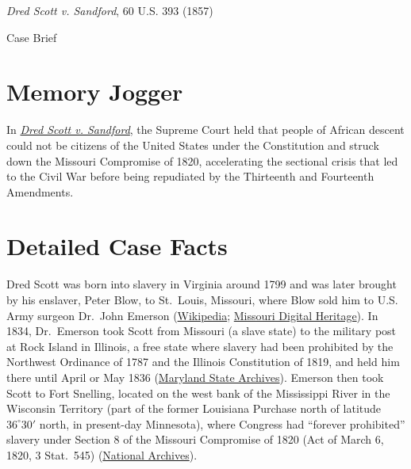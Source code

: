 \documentclass[12pt]{article}
\begin{document}
\begin{center}
{\LARGE \textit{Dred Scott v. Sandford}, 60 U.S. 393 (1857)\par}
\vspace{0.8em}
{\large Case Brief\par}
\end{center}
\vspace{1em}

\section{Memory Jogger}

In \href{https://www.courtlistener.com/opinion/87116/dred-scott-v-sandford/}{\textit{Dred Scott v. Sandford}}, the Supreme Court held that people of African descent could not be citizens of the United States under the Constitution and struck down the Missouri Compromise of 1820, accelerating the sectional crisis that led to the Civil War before being repudiated by the Thirteenth and Fourteenth Amendments.

\section{Detailed Case Facts}

Dred Scott was born into slavery in Virginia around 1799 and was later brought by his enslaver, Peter Blow, to St.\ Louis, Missouri, where Blow sold him to U.S. Army surgeon Dr.\ John Emerson (\href{https://en.wikipedia.org/wiki/Dred_Scott_v._Sandford}{Wikipedia}; \href{https://www.sos.mo.gov/archives/resources/africanamerican/scott/scott.asp}{Missouri Digital Heritage}). In 1834, Dr.\ Emerson took Scott from Missouri (a slave state) to the military post at Rock Island in Illinois, a free state where slavery had been prohibited by the Northwest Ordinance of 1787 and the Illinois Constitution of 1819, and held him there until April or May 1836 (\href{https://msa.maryland.gov/megafile/msa/speccol/sc5300/sc5339/000091/000000/000004/restricted/dred_scott/decision/nelson.html}{Maryland State Archives}). Emerson then took Scott to Fort Snelling, located on the west bank of the Mississippi River in the Wisconsin Territory (part of the former Louisiana Purchase north of latitude $36^{\circ}30'$ north, in present-day Minnesota), where Congress had ``forever prohibited'' slavery under Section 8 of the Missouri Compromise of 1820 (Act of March 6, 1820, 3 Stat.\ 545) (\href{https://www.archives.gov/milestone-documents/dred-scott-v-sandford}{National Archives}).
\end{document}
